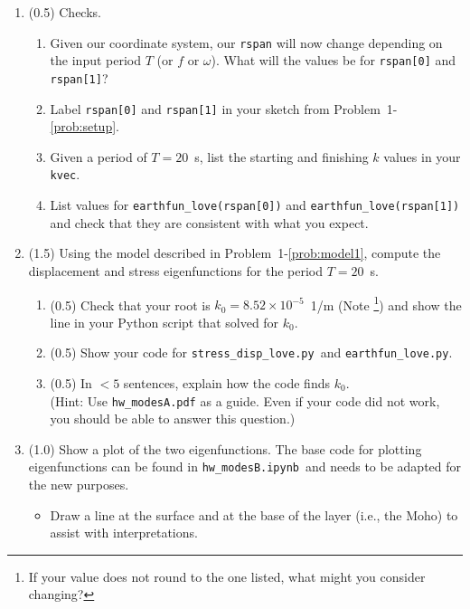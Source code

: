 \documentclass[11pt,titlepage,fleqn]{article}
\newcommand{\tfilemainB}{{\tt hw\_modesB.ipynb}}
\newcommand{\tfilesdtB}{{\tt stress\_disp\_love.py}}
\newcommand{\tfileefB}{{\tt earthfun\_love.py}}
\begin{document}
\begin{enumerate}
\begin{enumerate}
\item (0.5) Checks.
%
\begin{enumerate}
\item Given our coordinate system, our \verb+rspan+ will now change depending on the input period $T$ (or $f$ or $\omega$). What will the values be for \verb+rspan[0]+ and \verb+rspan[1]+?

\item Label \verb+rspan[0]+ and \verb+rspan[1]+ in your sketch from Problem~1-\ref{prob:setup}.

\item Given a period of $T = 20$~s, list the starting and finishing $k$ values in your \verb+kvec+.

\item List values for \verb+earthfun_love(rspan[0])+ and \verb+earthfun_love(rspan[1])+ and check that they are consistent with what you expect.
\end{enumerate}

\item (1.5) Using the model described in Problem~1-\ref{prob:model1}, compute the displacement and stress eigenfunctions for the period $T = 20$~s.

\begin{enumerate}
\item (0.5) Check that your root is $k_0 = 8.52 \times 10^{-5}$~1/m (Note \footnote{If your value does not round to the one listed, what might you consider changing?}) and show the line in your Python script that solved for $k_0$.

\item (0.5) Show your code for \tfilesdtB\ and \tfileefB.

\item (0.5) In $<5$ sentences, explain how the code finds $k_0$. \\
(Hint: Use \verb+hw_modesA.pdf+ as a guide. Even if your code did not work, you should be able to answer this question.)

\end{enumerate}

\item (1.0) Show a plot of the two eigenfunctions. The base code for plotting eigenfunctions can be found in \tfilemainB\ and needs to be adapted for the new purposes.

\begin{itemize}
\item Draw a line at the surface and at the base of the layer (i.e., the Moho) to assist with interpretations.


\end{itemize}
\end{enumerate}
\end{enumerate}
\end{document}
